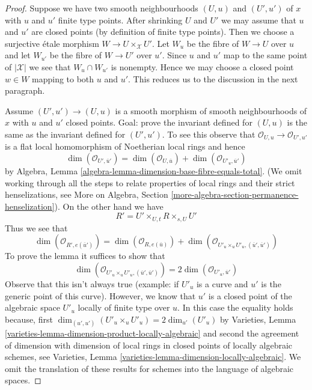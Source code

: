\documentclass{stacks-project}
\theoremstyle{plain}
\theoremstyle{definition}
\theoremstyle{remark}
\numberwithin{equation}{subsection}
\begin{document}
\begin{proof}
Suppose we have two smooth neighbourhoods $(U, u)$ and $(U', u')$
of $x$ with $u$ and $u'$ finite type points. After shrinking $U$
and $U'$ we may assume that $u$ and $u'$ are closed points
(by definition of finite type points). Then we choose
a surjective \'etale morphism $W \to U \times_\mathcal{X} U'$.
Let $W_u$ be the fibre of $W \to U$ over $u$ and
let $W_{u'}$ be the fibre of $W \to U'$ over $u'$.
Since $u$ and $u'$ map to the same point of $|\mathcal{X}|$
we see that $W_u \cap W_{u'}$ is nonempty.
Hence we may choose a closed point $w \in W$ mapping to
both $u$ and $u'$. This reduces us to the discussion in the
next paragraph.

\medskip\noindent
Assume $(U', u') \to (U, u)$ is a smooth morphism of smooth
neighbourhoods of $x$ with $u$ and $u'$ closed points.
Goal: prove the invariant defined for $(U, u)$ is the same
as the invariant defined for $(U', u')$.
To see this observe that $\mathcal{O}_{U, u} \to \mathcal{O}_{U', u'}$
is a flat local homomorphism of Noetherian local rings and hence
$$
\dim(\mathcal{O}_{U', \overline{u}'}) =
\dim(\mathcal{O}_{U, \overline{u}}) +
\dim(\mathcal{O}_{U'_u, \overline{u}'})
$$
by Algebra, Lemma \ref{algebra-lemma-dimension-base-fibre-equals-total}.
(We omit working through all the steps to relate properties of local
rings and their strict henselizations, see
More on Algebra, Section \ref{more-algebra-section-permanence-henselization}).
On the other hand we have
$$
R' = U' \times_{U, t} R \times_{s, U} U'
$$
Thus we see that
$$
\dim(\mathcal{O}_{R', e(\overline{u}')}) =
\dim(\mathcal{O}_{R, e(\overline{u})}) +
\dim(\mathcal{O}_{U'_u \times_u U'_u, (\overline{u}', \overline{u}')})
$$
To prove the lemma it suffices to show that
$$
\dim(\mathcal{O}_{U'_u \times_u U'_u, (\overline{u}', \overline{u}')}) =
2\dim(\mathcal{O}_{U'_u, \overline{u}'})
$$
Observe that this isn't always true (example: if $U'_u$ is a curve
and $u'$ is the generic point of this curve). However, we know
that $u'$ is a closed point of the algebraic space $U'_u$ locally
of finite type over $u$. In this case the equality holds because, first
$\dim_{(u', u')}(U'_u \times_u U'_u) = 2\dim_{u'}(U'_u)$ by
Varieties, Lemma \ref{varieties-lemma-dimension-product-locally-algebraic}
and second the agreement of dimension with dimension of local rings
in closed points of locally algebraic schemes, see
Varieties, Lemma \ref{varieties-lemma-dimension-locally-algebraic}.
We omit the translation of these results for schemes into the
language of algebraic spaces.
\end{proof}
\end{document}
